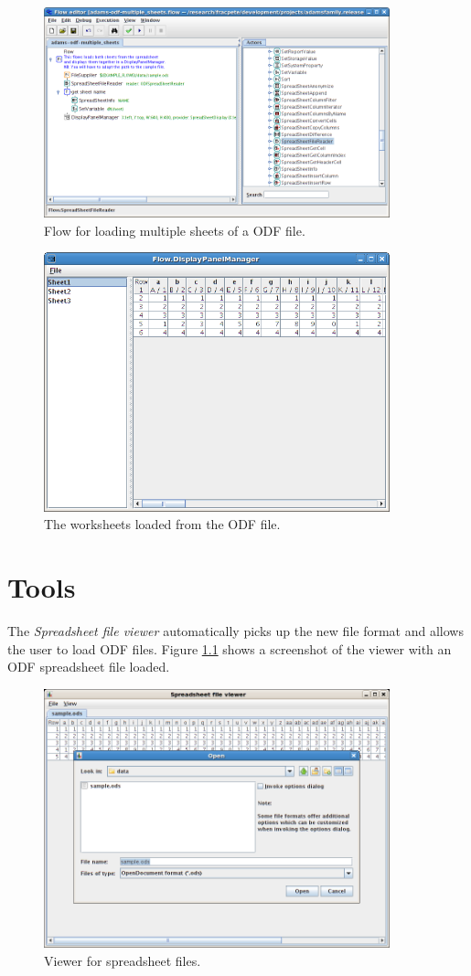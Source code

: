 \documentclass[a4paper]{book}
\begin{document}
\begin{figure}[htb]
  \centering
  \includegraphics[width=10.0cm]{images/spreadsheet-display-flow.png}
  \caption{Flow for loading multiple sheets of a ODF file.}
  \label{spreadsheet-display-flow}
\end{figure}

\begin{figure}[htb]
  \centering
  \includegraphics[width=10.0cm]{images/spreadsheet-display-output.png}
  \caption{The worksheets loaded from the ODF file.}
  \label{spreadsheet-display-output}
\end{figure}

\chapter{Tools}
The \textit{Spreadsheet file viewer} automatically picks up the new file format
and allows the user to load ODF files. Figure \ref{spreadsheet-viewer}
shows a screenshot of the viewer with an ODF spreadsheet file loaded.

\begin{figure}[htb]
  \centering
  \includegraphics[width=10.0cm]{images/spreadsheet-viewer.png}
  \caption{Viewer for spreadsheet files.}
  \label{spreadsheet-viewer}
\end{figure}


\end{document}
